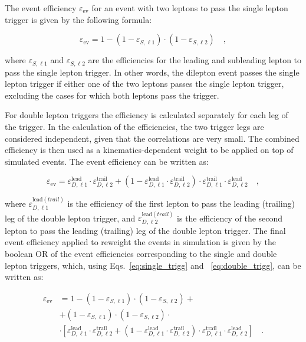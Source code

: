 The event efficiency $\varepsilon_\mathrm{ev}$ for an event with two leptons to pass the single lepton trigger is given by the following formula:

\begin{equation}\label{eq:single_trigg}
\varepsilon_\mathrm{ev} = 1 - (1-\varepsilon_{S,\ell1})\cdot(1-\varepsilon_{S,\ell2})\quad,
\end{equation}

where $\varepsilon_{S,\ell1}$ and $\varepsilon_{S,\ell2}$ are the efficiencies for the leading and subleading lepton to pass the single lepton trigger. In other words, the dilepton event passes the single lepton trigger if either one of the two leptons passes the single lepton trigger, excluding the cases for which both leptons pass the trigger. 

For double lepton triggers the efficiency is calculated separately for each leg of the trigger. In the calculation of the efficiencies, the two trigger legs are considered independent, given that the correlations are very small. The combined efficiency is then used as a kinematics-dependent weight to be applied on top of simulated events. The event efficiency can be written as:

\begin{equation}\label{eq:double_trigg}
\varepsilon_\mathrm{ev}  = \varepsilon_{D,\ell1}^\mathrm{lead} \cdot \varepsilon_{D,\ell2}^\mathrm{trail} + (  1 -  \varepsilon_{D,\ell1}^\mathrm{lead} \cdot \varepsilon_{D,\ell2}^\mathrm{trail})\cdot\varepsilon_{D,\ell1}^\mathrm{trail} \cdot \varepsilon_{D,\ell2}^\mathrm{lead} \quad,
\end{equation}

where $\varepsilon_{D,\ell1}^{\mathrm{lead}(trail)}$ is the efficiency of the first lepton to pass the leading (trailing) leg of the double lepton trigger, and $\varepsilon_{D,\ell2}^{\mathrm{lead}(trail)}$ is the efficiency of the second lepton to pass the leading (trailing) leg of the double lepton trigger. The final event efficiency applied to reweight the events in simulation is given by the boolean OR of the event efficiencies corresponding to the single and double lepton triggers, which, using Eqs.~\eqref{eq:single_trigg} and ~\eqref{eq:double_trigg}, can be written as:

\begin{equation}
\begin{split}
\varepsilon_\mathrm{ev} & = 1 - (1-\varepsilon_{S,\ell1})\cdot(1-\varepsilon_{S,\ell2}) + \\
                     & + (1-\varepsilon_{S,\ell1})\cdot(1-\varepsilon_{S,\ell2}) \cdot \\
                     & \cdot [ \varepsilon_{D,\ell1}^\mathrm{lead} \cdot \varepsilon_{D,\ell2}^\mathrm{trail} + (  1 -  \varepsilon_{D,\ell1}^\mathrm{lead} \cdot \varepsilon_{D,\ell2}^\mathrm{trail})\cdot\varepsilon_{D,\ell1}^\mathrm{trail} \cdot \varepsilon_{D,\ell2}^\mathrm{lead} ] \quad.
\end{split}
\end{equation}

